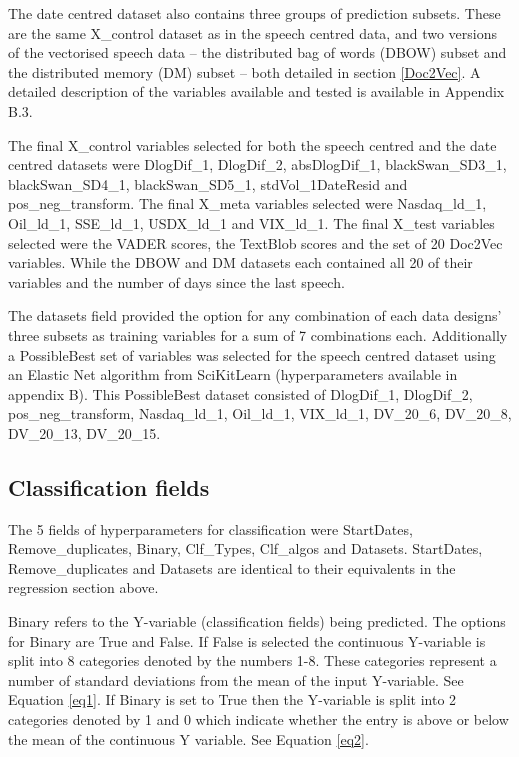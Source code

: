 \documentclass[11pt,preprint, authoryear]{elsarticle}
\numberwithin{equation}{section}
\numberwithin{figure}{section}
\numberwithin{table}{section}
\begin{document}
The date centred dataset also contains three groups of prediction
subsets. These are the same X\_control dataset as in the speech centred
data, and two versions of the vectorised speech data -- the distributed
bag of words (DBOW) subset and the distributed memory (DM) subset --
both detailed in section \ref{Doc2Vec}. A detailed description of the
variables available and tested is available in Appendix B.3.

The final X\_control variables selected for both the speech centred and
the date centred datasets were DlogDif\_1, DlogDif\_2, absDlogDif\_1,
blackSwan\_SD3\_1, blackSwan\_SD4\_1, blackSwan\_SD5\_1,
stdVol\_1DateResid and pos\_neg\_transform. The final X\_meta variables
selected were Nasdaq\_ld\_1, Oil\_ld\_1, SSE\_ld\_1, USDX\_ld\_1 and
VIX\_ld\_1. The final X\_test variables selected were the VADER scores,
the TextBlob scores and the set of 20 Doc2Vec variables. While the DBOW
and DM datasets each contained all 20 of their variables and the number
of days since the last speech.

The datasets field provided the option for any combination of each data
designs' three subsets as training variables for a sum of 7 combinations
each. Additionally a PossibleBest set of variables was selected for the
speech centred dataset using an Elastic Net algorithm from SciKitLearn
(hyperparameters available in appendix B). This PossibleBest dataset
consisted of DlogDif\_1, DlogDif\_2, pos\_neg\_transform, Nasdaq\_ld\_1,
Oil\_ld\_1, VIX\_ld\_1, DV\_20\_6, DV\_20\_8, DV\_20\_13, DV\_20\_15.

\hypertarget{classification-fields}{%
\subsection{Classification fields}\label{classification-fields}}

The 5 fields of hyperparameters for classification were StartDates,
Remove\_duplicates, Binary, Clf\_Types, Clf\_algos and Datasets.
StartDates, Remove\_duplicates and Datasets are identical to their
equivalents in the regression section above.

Binary refers to the Y-variable (classification fields) being predicted.
The options for Binary are True and False. If False is selected the
continuous Y-variable is split into 8 categories denoted by the numbers
1-8. These categories represent a number of standard deviations from the
mean of the input Y-variable. See Equation \ref{eq1}. If Binary is set
to True then the Y-variable is split into 2 categories denoted by 1 and
0 which indicate whether the entry is above or below the mean of the
continuous Y variable. See Equation \ref{eq2}.
\end{document}
